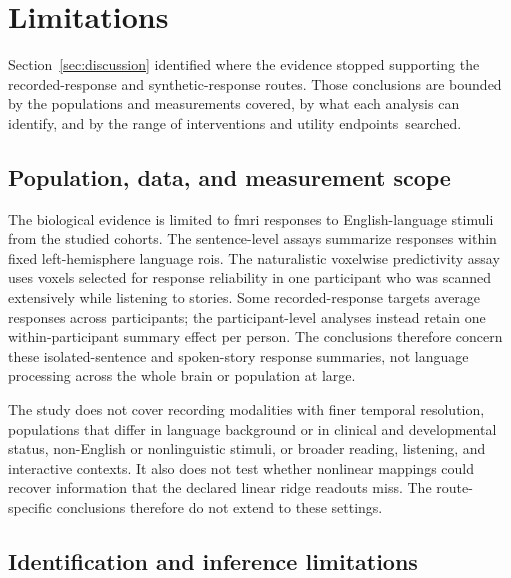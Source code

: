 \section{Limitations}
\label{sec:limitations}

Section~\ref{sec:discussion} identified where the evidence stopped supporting the recorded-response and synthetic-response routes.
Those conclusions are bounded by the populations and measurements covered, by what each analysis can identify, and by the range of interventions and utility endpoints~searched.

\subsection{Population, data, and measurement scope}

The biological evidence is limited to \ac{fmri} responses to English-language stimuli from the studied cohorts.
The sentence-level assays summarize responses within fixed left-hemisphere language \acp{roi}.
The naturalistic voxelwise predictivity assay uses voxels selected for response reliability in one participant who was scanned extensively while listening to stories.
Some recorded-response targets average responses across participants; the participant-level analyses instead retain one within-participant summary effect per person.
The conclusions therefore concern these isolated-sentence and spoken-story response summaries, not language processing across the whole brain or population at large.

The study does not cover recording modalities with finer temporal resolution, populations that differ in language background or in clinical and developmental status, non-English or nonlinguistic stimuli, or broader reading, listening, and interactive contexts.
It also does not test whether nonlinear mappings could recover information that the declared linear ridge readouts miss.
The route-specific conclusions therefore do not extend to these settings.

\subsection{Identification and inference limitations}


